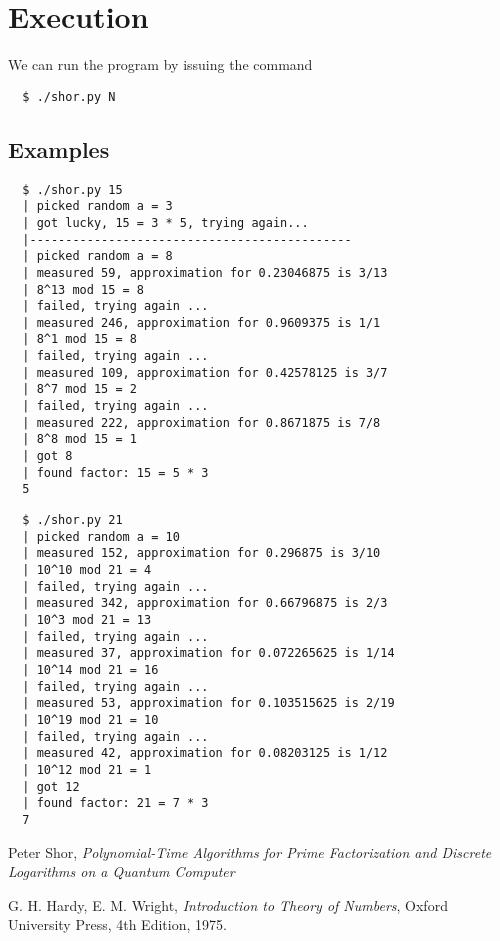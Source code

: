 \documentclass{article}
\begin{document}
\section{Execution}

We can run the program by issuing the command
\begin{lstlisting}
  $ ./shor.py N
\end{lstlisting}

\subsection{Examples}

\begin{lstlisting}
  $ ./shor.py 15
  | picked random a = 3
  | got lucky, 15 = 3 * 5, trying again...
  |---------------------------------------------
  | picked random a = 8
  | measured 59, approximation for 0.23046875 is 3/13
  | 8^13 mod 15 = 8
  | failed, trying again ...
  | measured 246, approximation for 0.9609375 is 1/1
  | 8^1 mod 15 = 8
  | failed, trying again ...
  | measured 109, approximation for 0.42578125 is 3/7
  | 8^7 mod 15 = 2
  | failed, trying again ...
  | measured 222, approximation for 0.8671875 is 7/8
  | 8^8 mod 15 = 1
  | got 8
  | found factor: 15 = 5 * 3
  5
\end{lstlisting}


\begin{lstlisting}
  $ ./shor.py 21
  | picked random a = 10
  | measured 152, approximation for 0.296875 is 3/10
  | 10^10 mod 21 = 4
  | failed, trying again ...
  | measured 342, approximation for 0.66796875 is 2/3
  | 10^3 mod 21 = 13
  | failed, trying again ...
  | measured 37, approximation for 0.072265625 is 1/14
  | 10^14 mod 21 = 16
  | failed, trying again ...
  | measured 53, approximation for 0.103515625 is 2/19
  | 10^19 mod 21 = 10
  | failed, trying again ...
  | measured 42, approximation for 0.08203125 is 1/12
  | 10^12 mod 21 = 1
  | got 12
  | found factor: 21 = 7 * 3
  7 
\end{lstlisting}

\begin{thebibliography}{9}
  Peter Shor,
  \emph{Polynomial-Time Algorithms for Prime Factorization and Discrete
Logarithms on a Quantum Computer}

  G. H. Hardy,
  E. M. Wright,
  \emph{Introduction to Theory of Numbers},
  Oxford University Press,
  4th Edition,
  1975.

\end{thebibliography}
\end{document}

